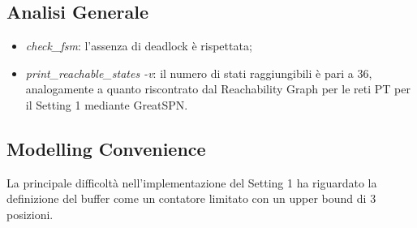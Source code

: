 \documentclass{article}
\begin{document}
\subsection{Analisi Generale}
    \begin{itemize}
        \item \textit{check\_fsm}: l'assenza di deadlock è rispettata;
        \item \textit{print\_reachable\_states -v}: il numero di stati raggiungibili è pari a 36, analogamente a quanto riscontrato dal Reachability Graph per le reti PT per il Setting 1 mediante GreatSPN.
    \end{itemize}
\subsection{Modelling Convenience}
La principale difficoltà nell'implementazione del Setting 1 ha riguardato la definizione del buffer come un contatore limitato con un upper bound di 3 posizioni.
\clearpage
\end{document}
